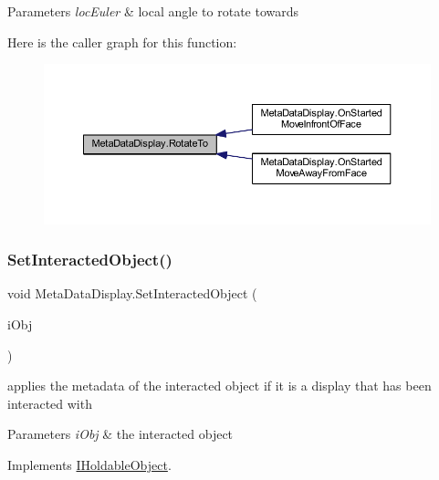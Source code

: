 \begin{DoxyParams}{Parameters}
{\em loc\+Euler} & local angle to rotate towards\\
\hline
\end{DoxyParams}
Here is the caller graph for this function\+:
\nopagebreak
\begin{figure}[H]
\begin{center}
\leavevmode
\includegraphics[width=350pt]{class_meta_data_display_adee283ec76c3631bf535ae3e5071090b_icgraph}
\end{center}
\end{figure}
\mbox{\label{class_meta_data_display_a29b7b1ec6193b73606dc7da89c387529}} 
\subsubsection{\texorpdfstring{Set\+Interacted\+Object()}{SetInteractedObject()}}
{\footnotesize\ttfamily void Meta\+Data\+Display.\+Set\+Interacted\+Object (\begin{DoxyParamCaption}\item[{\mbox{\hyperlink{interface_i_interactable}{I\+Interactable}}}]{i\+Obj }\end{DoxyParamCaption})}



applies the metadata of the interacted object if it is a display that has been interacted with 


\begin{DoxyParams}{Parameters}
{\em i\+Obj} & the interacted object\\
\hline
\end{DoxyParams}


Implements \mbox{\hyperlink{interface_i_holdable_object_aeb32a55273b99d16f9fb5b86f6a73f80}{I\+Holdable\+Object}}.


